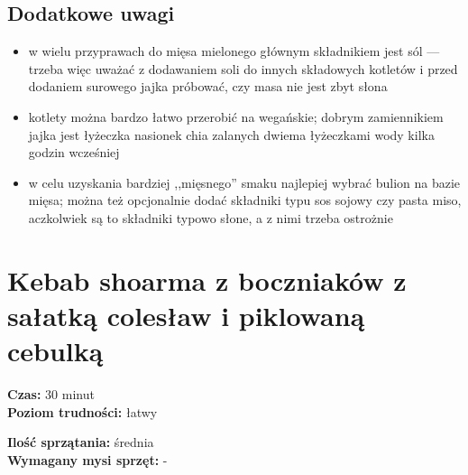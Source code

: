\documentclass[a4paper,10pt]{book}
\begin{document}
\subsection*{Dodatkowe uwagi}
\begin{itemize}
    \item w wielu przyprawach do mięsa mielonego głównym składnikiem jest sól --- trzeba więc uważać z dodawaniem soli do innych składowych kotletów i przed dodaniem surowego jajka próbować, czy masa nie jest zbyt słona
    \item kotlety można bardzo łatwo przerobić na wegańskie; dobrym zamiennikiem jajka jest łyżeczka nasionek chia zalanych dwiema łyżeczkami wody kilka godzin wcześniej
    \item w celu uzyskania bardziej ,,mięsnego'' smaku najlepiej wybrać bulion na bazie mięsa; można też opcjonalnie dodać składniki typu sos sojowy czy pasta miso, aczkolwiek są to składniki typowo słone, a z nimi trzeba ostrożnie
\end{itemize}

\newpage 

\section{Kebab shoarma z boczniaków z sałatką colesław i piklowaną cebulką}
\bigskip
\small
\begin{minipage}{0.45\textwidth}
    \noindent \textbf{Czas:} 30 minut \\
    \textbf{Poziom trudności:} łatwy
\end{minipage}
\begin{minipage}{0.45\textwidth}
    \noindent \textbf{Ilość sprzątania:} średnia\\
    \textbf{Wymagany mysi sprzęt:} -
\end{minipage}
\normalsize
\vspace{0.5cm}
\end{document}
